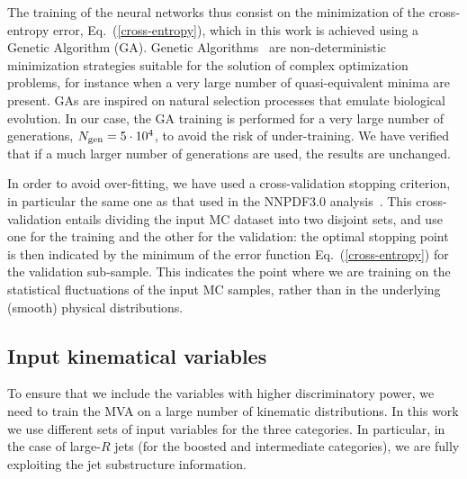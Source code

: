  
 The training of the neural networks thus consist on the
 minimization of the cross-entropy error,
 Eq.~(\ref{cross-entropy}), which in this work is achieved using a
 Genetic Algorithm (GA).
 Genetic Algorithms~\cite{quevedo,tau,Abel:2014xta,Nesseris:2012tt} are
 non-deterministic
 minimization strategies suitable for the solution
 of complex optimization problems, for instance when a very large number
 of quasi-equivalent minima are present.
 GAs are inspired on natural selection processes
 that emulate biological evolution. 
 In our case, the GA training is performed for a very large 
 number of generations, $N_{\rm gen}=5\cdot 10^{4}$, to avoid the risk of
 under-training.
 We have verified that if a much larger number of generations
 are used, the results are unchanged.

 In order to avoid over-fitting,
 we have used a cross-validation stopping
 criterion, in particular the same one as
 that used in the NNPDF3.0 analysis~\cite{Ball:2014uwa}.
 This cross-validation entails dividing the input MC dataset into two disjoint sets,
 and use one for the training and the other for the validation: the optimal
 stopping point is then indicated by the minimum of the error function
 Eq.~(\ref{cross-entropy}) for the validation sub-sample.
 This indicates the point where we are training on the statistical fluctuations
 of the input MC samples, rather than in the underlying (smooth) physical
 distributions.
 

 \subsection{Input kinematical variables}
 \label{sec:input}

 To ensure that we include the variables with higher discriminatory power,
 we need to train
 the MVA on a large number of kinematic distributions.
%
In this work we use different sets of
input variables for the three categories.
%
In particular, in the case of large-$R$ jets (for the boosted
and intermediate categories), we are fully exploiting the jet
substructure information.

